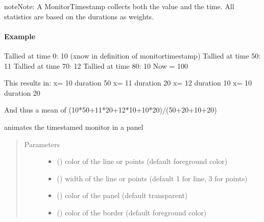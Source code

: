 \documentclass[letterpaper,10pt,english]{sphinxmanual}
\begin{document}
\begin{fulllineitems}
\begin{quote}
\begin{description}
\begin{itemize}
\end{itemize}

\end{description}\end{quote}

\begin{sphinxadmonition}{note}{Note:}
A MonitorTimestamp collects both the value and the time.
All statistics are based on the durations as weights.
\end{sphinxadmonition}
\paragraph{Example}

Tallied at time   0: 10 (xnow in definition of monitortimestamp) 
Tallied at time  50: 11 
Tallied at time  70: 12 
Tallied at time  80: 10 
Now = 100

This results in:  
x=  10 duration 50 
x=  11 duration 20 
x=  12 duration 10 
x=  10 duration 20

And thus a mean of (10*50+11*20+12*10+10*20)/(50+20+10+20)

\begin{fulllineitems}
\label{\detokenize{Reference:salabim.MonitorTimestamp.animate}}
animates the timestamed monitor in a panel
\begin{quote}\begin{description}
\item[{Parameters}] \leavevmode\begin{itemize}
\item {} 
 () \textendash{} color of the line or points (default foreground color)

\item {} 
 () \textendash{} width of the line or points (default 1 for line, 3 for points)

\item {} 
 () \textendash{} color of the panel (default transparent)

\item {} 
 () \textendash{} color of the border (default foreground color)


\end{itemize}
\end{description}
\end{quote}
\end{fulllineitems}
\end{fulllineitems}
\end{document}
